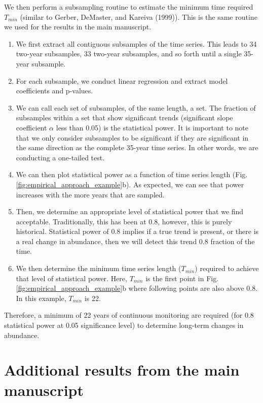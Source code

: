 \documentclass[12pt,]{article}
\begin{document}
We then perform a subsampling routine to estimate the minimum time
required \(T_{min}\) (similar to Gerber, DeMaster, and Kareiva (1999)).
This is the same routine we used for the results in the main manuscript.

\begin{enumerate}
  \item We first extract all contiguous subsamples of the time series. This leads to 34 two-year subsamples, 33 two-year subsamples, and so forth until a single 35-year subsample.  
  \item For each subsample, we conduct linear regression and extract model coefficients and p-values.    \item We can call each set of subsamples, of the same length, a set. The fraction of subsamples within a set that show significant trends (significant slope coefficient $\alpha$ less than 0.05) is the statistical power. It is important to note that we only consider subsamples to be significant if they are significant in the same direction as the complete 35-year time series. In other words, we are conducting a one-tailed test.
  \item We can then plot statistical power as a function of time series length (Fig. \ref{fig:empirical_approach_example}b). As expected, we can see that power increases with the more years that are sampled.
  \item  Then, we determine an appropriate level of statistical power that we find acceptable. Traditionally, this has been at 0.8, however, this is purely historical. Statistical power of 0.8 implies if a true trend is present, or there is a real change in abundance, then we will detect this trend 0.8 fraction of the time. 
  \item We then determine the minimum time series length ($T_{min}$) required to achieve that level of statistical power. Here, $T_{min}$ is the first point in Fig. \ref{fig:empirical_approach_example}b where following points are also above 0.8. In this example, $T_{min}$ is 22. 
\end{enumerate}

Therefore, a minimum of 22 years of continuous monitoring are required
(for 0.8 statistical power at 0.05 significance level) to determine
long-term changes in abundance.

\section{Additional results from the main
manuscript}\label{additional-results-from-the-main-manuscript}
\end{document}
